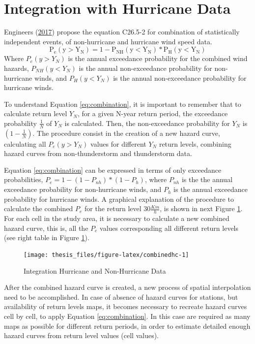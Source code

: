 \documentclass[12pt,oneside]{reedthesis}
\begin{document}
\hypertarget{integration}{%
\section{Integration with Hurricane Data}\label{integration}}

Engineers (\protect\hyperlink{ref-Asce2017}{2017}) propose the equation C26.5-2 for combination of statistically independent events, of non-hurricane and hurricane wind speed data.
\begin{equation}
  \mathrm{
          P_e(y>Y_N) = 1 - P_{NH}(y<Y_N)*P_{H}(y<Y_N)
        }
  \label{eq:combination}
\end{equation}
Where \(P_e(y>Y_N)\) is the annual exceedance probability for the combined wind hazards, \(P_{NH}(y<Y_N)\) is the annual non-exceedance probability for non-hurricane winds, and \(P_{H}(y<Y_N)\) is the annual non-exceedance probability for hurricane winds.

To understand Equation \eqref{eq:combination}, it is important to remember that to calculate return level \(Y_N\), for a given N-year return period, the exceedance probability \(\frac{1}{N}\) of \(Y_N\) is calculated. Then, the non-exceedance probability for \(Y_N\) is \(\left(1-\frac{1}{N}\right)\). The procedure consist in the creation of a new hazard curve, calculating all \(P_e(y>Y_N)\) values for different \(Y_N\) return levels, combining hazard curves from non-thunderstorm and thunderstorm data.

Equation \eqref{eq:combination} can be expressed in terms of only exceedance probabilities, \(P_{e} = 1 - (1 -P_{nh}) * (1 - P_{h})\), where \(P_{nh}\) is the the annual exceedance probability for non-hurricane winds, and \(P_{h}\) is the annual exceedance probability for hurricane winds. A graphical explanation of the procedure to calculate the combined \(P_e\) for the return level \(30\frac{Km}{h}\), is shown in next Figure \ref{fig:combinedhc}. For each cell in the study area, it is necessary to calculate a new combined hazard curve, this is, all the \(P_e\) values corresponding all different return levels (see right table in Figure \ref{fig:combinedhc}).
\begin{figure}

{\centering \texttt{[image: thesis\_files/figure-latex/combinedhc-1]} 

}

\caption{Integration Hurricane and Non-Hurricane Data}\label{fig:combinedhc}
\end{figure}
After the combined hazard curve is created, a new process of spatial interpolation need to be accomplished. In case of absence of hazard curves for stations, but availability of return levels maps, it becomes necessary to recreate hazard curves cell by cell, to apply Equation \eqref{eq:combination}. In this case are required as many maps as possible for different return periods, in order to estimate detailed enough hazard curves from return level values (cell values).
\end{document}
